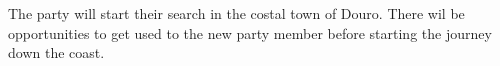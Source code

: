 The party will start their search in the costal town of Douro.
There wil be opportunities to get used to the new party member before starting the journey down the coast.